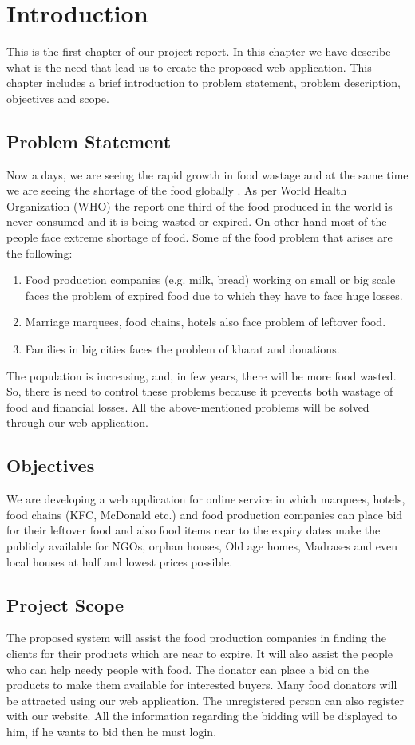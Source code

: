 \doublespacing
\chapter{Introduction}

This is the first chapter of our project report. In this chapter we have describe what is the need that lead us to create the proposed web application. This chapter includes a brief introduction to problem statement, problem description, objectives and scope.

\section{Problem Statement}
Now a days, we are seeing the rapid growth in food wastage and at the same time we are seeing the shortage of the food globally \cite{wenlock1980household}. As per World Health Organization (WHO) the report one third of the food produced in the world is never consumed and it is being wasted or expired. On other hand most of the people face extreme shortage of food.  Some of the food problem that arises are the following:
\begin{enumerate}
    \item Food production companies (e.g. milk, bread) working on small or big scale faces the problem of expired food due to which they have to face huge losses.
    \item Marriage marquees, food chains, hotels also face problem of leftover food.
    \item Families in big cities faces the problem of kharat and donations.
\end{enumerate}
The population is increasing, and, in few years, there will be more food wasted. So, there is need to control these problems because it prevents both wastage of food and financial losses. All the above-mentioned problems will be solved through our web application.

	
\section{Objectives}
We are developing a web application for online service in which marquees, hotels, food chains (KFC, McDonald etc.) and food production companies can place bid for their leftover food and also food items near to the expiry dates make the publicly available for NGOs, orphan houses, Old age homes, Madrases and even local houses at half and lowest prices possible.
\section{Project Scope}
The proposed system will assist the food production companies in finding the clients for their products which are near to expire. It will also assist the people who can help needy people with food. The donator can place a bid on the products to make them available for interested buyers. Many food donators will be attracted using our web application. The unregistered person can also register with our website. All the information regarding the bidding will be displayed to him, if he wants to bid then he must login.
